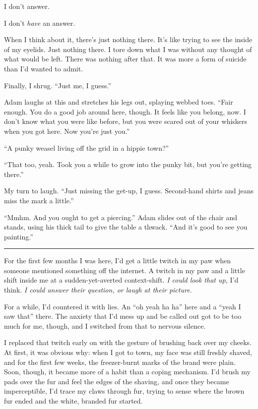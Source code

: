 I don't answer.

I don't \emph{have} an answer.

When I think about it, there's just nothing there. It's like trying to see the inside of my eyelids. Just nothing there. I tore down what I was without any thought of what would be left. There was nothing after that. It was more a form of suicide than I'd wanted to admit.

Finally, I shrug. ``Just me, I guess.''

Adam laughs at this and stretches his legs out, splaying webbed toes. ``Fair enough. You do a good job around here, though. It feels like you belong, now. I don't know what you were like before, but you were scared out of your whiskers when you got here. Now you're just you.''

``A punky weasel living off the grid in a hippie town?''

``That too, yeah. Took you a while to grow into the punky bit, but you're getting there.''

My turn to laugh. ``Just missing the get-up, I guess. Second-hand shirts and jeans miss the mark a little.''

``Mmhm. And you ought to get a piercing.'' Adam slides out of the chair and stands, using his thick tail to give the table a thwack. ``And it's good to see you painting.''

\begin{center}\rule{0.5\linewidth}{\linethickness}\end{center}

For the first few months I was here, I'd get a little twitch in my paw when someone mentioned something off the internet. A twitch in my paw and a little shift inside me at a sudden-yet-averted context-shift. \emph{I could look that up,} I'd think. \emph{I could answer their question, or laugh at their picture.}

For a while, I'd countered it with lies. An ``oh yeah ha ha'' here and a ``yeah I saw that'' there. The anxiety that I'd mess up and be called out got to be too much for me, though, and I switched from that to nervous silence.

I replaced that twitch early on with the gesture of brushing back over my cheeks. At first, it was obvious why: when I got to town, my face was still freshly shaved, and for the first few weeks, the freezer-burnt marks of the brand were plain. Soon, though, it became more of a habit than a coping mechanism. I'd brush my pads over the fur and feel the edges of the shaving, and once they became imperceptible, I'd trace my claws through fur, trying to sense where the brown fur ended and the white, branded fur started.

